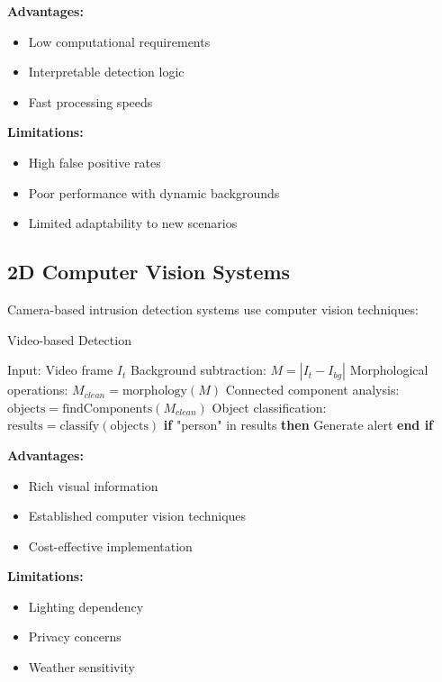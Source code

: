 \documentclass[conference]{IEEEtran}
\begin{document}
\textbf{Advantages:}
\begin{itemize}
\item Low computational requirements
\item Interpretable detection logic
\item Fast processing speeds
\end{itemize}

\textbf{Limitations:}
\begin{itemize}
\item High false positive rates
\item Poor performance with dynamic backgrounds
\item Limited adaptability to new scenarios
\end{itemize}

\subsection{2D Computer Vision Systems}
Camera-based intrusion detection systems use computer vision techniques:

\begin{algorithm}
\caption{Video-based Detection}
\begin{algorithmic}[1]
\STATE Input: Video frame $I_t$
\STATE Background subtraction: $M = |I_t - I_{bg}|$
\STATE Morphological operations: $M_{clean} = \text{morphology}(M)$
\STATE Connected component analysis: $\text{objects} = \text{findComponents}(M_{clean})$
\STATE Object classification: $\text{results} = \text{classify}(\text{objects})$
\STATE \textbf{if} "person" in results \textbf{then}
\STATE \quad Generate alert
\STATE \textbf{end if}
\end{algorithmic}
\end{algorithm}

\textbf{Advantages:}
\begin{itemize}
\item Rich visual information
\item Established computer vision techniques
\item Cost-effective implementation
\end{itemize}

\textbf{Limitations:}
\begin{itemize}
\item Lighting dependency
\item Privacy concerns
\item Weather sensitivity
\end{itemize}
\end{document}
